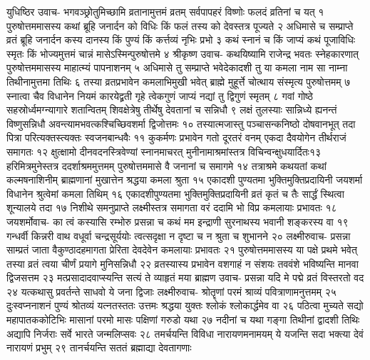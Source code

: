 युधिष्ठिर उवाच-
भगवञ्छ्रोतुमिच्छामि व्रतानामुत्तमं व्रतम् 
सर्वपापहरं विष्णोः फलदं व्रतिनां च यत् १
पुरुषोत्तममासस्य कथां ब्रूहि जनार्दन 
को विधिः किं फलं तस्य को देवस्तत्र पूज्यते २
अधिमासे च सम्प्राप्ते व्रतं ब्रूहि जनार्दन 
कस्य दानस्य किं पुण्यं किं कर्त्तव्यं नृभिः प्रभो ३
कथं स्नानं च किं जाप्यं कथं पूजाविधिः स्मृतः 
किं भोज्यमुत्तमं चान्नं मासेऽस्मिन्पुरुषोत्तमे ४
श्रीकृष्ण उवाच-
कथयिष्यामि राजेन्द्र भवतः स्नेहकारणात् 
पुरुषोत्तममासस्य माहात्म्यं पापनाशनम् ५
अधिमासे तु सम्प्राप्ते भवेदेकादशी तु या 
कमला नाम सा नाम्ना तिथीनामुत्तमा तिथिः ६
तस्या व्रतप्रभावेन कमलाभिमुखी भवेत् 
ब्राह्मे मुहूर्त्ते चोत्थाय संस्मृत्य पुरुषोत्तमम् ७
स्नात्वा चैव विधानेन नियमं कारयेद्व्रती 
गृहे त्वेकगुणं जाप्यं नद्यां तु द्विगुणं स्मृतम् ८
गवां गोष्ठे सहस्रोर्ध्वमग्न्यागारे शतान्वितम् 
शिवक्षेत्रेषु तीर्थेषु देवतानां च सन्निधौ ९
लक्षं तुलस्याः सान्निध्ये ह्यनन्तं विष्णुसन्निधौ 
अवन्त्यामभवत्कश्चिच्छिवशर्मा द्विजोत्तमः १०
तस्यात्मजास्तु पञ्चासन्कनिष्ठो दोषवानभूत् 
तदा पित्रा परित्यक्तस्त्यक्तः स्वजनबान्धवैः ११
कुकर्मणः प्रभावेन गतो दूरतरं वनम् 
एकदा दैवयोगेन तीर्थराजं समागतः १२
क्षुत्क्षामो दीनवदनस्त्रिवेण्यां स्नानमाचरत् 
मुनीनामाश्रमांस्तत्र विचिन्वन्क्षुधयार्दितः१३
हरिमित्रमुनेस्तत्र ददर्शाश्रममुत्तमम् 
पुरुषोत्तममासे वै जनानां च समागमे १४
तत्राश्रमे कथयतां कथां कल्मषनाशिनीम् 
ब्राह्मणानां मुखात्तेन श्रद्धया कमला श्रुता १५
एकादशी पुण्यतमा भुक्तिमुक्तिप्रदायिनी 
जयशर्मा विधानेन श्रुत्वेमां कमला तिथिम् १६
एकादशीपुण्यतमा भुक्तिमुक्तिप्रदायिनी 
व्रतं कृतं च तैः सार्द्धं स्थित्वा शून्यालये तदा १७
निशीथे समनुप्राप्ते लक्ष्मीस्तत्र समागता 
वरं ददामि भो विप्र कमलायाः प्रभावतः १८
जयशर्मोवाच-
का त्वं कस्यासि रम्भोरु प्रसन्ना च कथं मम 
इन्द्राणी सुरनाथस्य भवानी शङ्करस्य वा १९
गन्धर्वी किन्नरी वाथ वधूर्वा चन्द्रसूर्ययोः 
त्वत्सदृक्षा न दृष्टा च न श्रुता च शुभानने २०
लक्ष्मीरुवाच-
प्रसन्ना साम्प्रतं जाता वैकुण्ठादहमागता 
प्रेरिता देवदेवेन कमलायाः प्रभावतः २१
पुरुषोत्तममासस्य या पक्षे प्रथमे भवेत् 
तस्या व्रतं त्वया चीर्णं प्रयागे मुनिसन्निधौ २२
व्रतस्यास्य प्रभावेन वशगाहं न संशयः 
तववंशे भविष्यन्ति मानवा द्विजसत्तम २३
मत्प्रसादादवाप्स्यन्ति सत्यं ते व्याहृतं मया 
ब्राह्मण उवाच-
प्रसन्ना यदि मे पद्मे व्रतं विस्तरतो वद २४
यत्कथासु प्रवर्तन्ते साधवो ये जना द्विजाः 
लक्ष्मीरुवाच-
श्रोतॄणां परमं श्राव्यं पवित्राणामनुत्तमम् २५
दुःस्वप्ननाशनं पुण्यं श्रोतव्यं यत्नतस्ततः 
उत्तमः श्रद्धया युक्तः श्लोकं श्लोकार्द्धमेव वा २६
पठित्वा मुच्यते सद्यो महापातककोटिभिः 
मासानां परमो मासः पक्षिणां गरुडो यथा २७
नदीनां च यथा गङ्गा तिथीनां द्वादशी तिथिः 
अद्यापि निर्जराः सर्वे भारते जन्मलिप्सवः २८
तमर्चयन्ति विविधा नारायणमनामयम् 
ये यजन्ति सदा भक्त्या देवं नारायणं प्रभुम् २९
तानर्चयन्ति सततं ब्रह्माद्या देवतागणाः 
